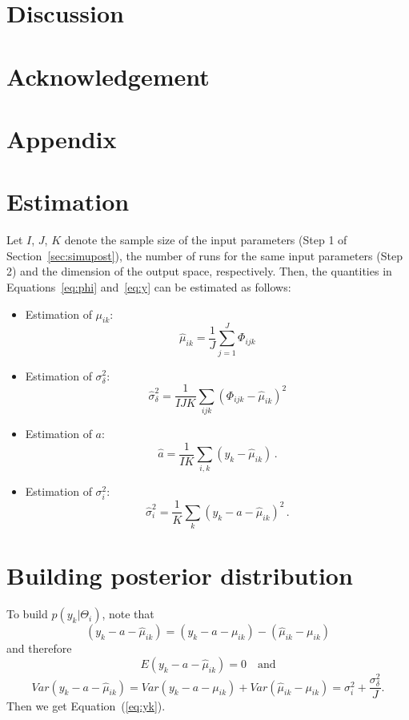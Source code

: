 \documentclass[11pt, fleqn]{article}
\begin{document}
\section{Discussion}
\label{sec:Disc}

\section*{Acknowledgement}

\section*{Appendix}
\begin{appendix}
\section{Estimation}
\label{app:est}
Let $I$, $J$, $K$ denote the sample size of the input parameters (Step 1 of
Section~\ref{sec:simupost}), the number of runs for the same input parameters
(Step 2) and the dimension of the output space, respectively. Then, the
quantities in Equations~\ref{eq:phi} and~\ref{eq:y} can be estimated as
follows: 
\begin{itemize}
\item Estimation of  $\mu_{ik}$:
\begin{equation}
\hat{\mu}_{ik}= \frac{1}{J}\sum_{j=1}^{J}\Phi_{ijk}
\end{equation}
\item Estimation of  $\sigma_{\delta}^2$:
      \begin{equation}
        \label{eq:sigma-delta-est}
        \hat{\sigma}_{\delta}^2 = \frac{1}{IJK}\sum_{ijk}(\Phi_{ijk} -
        \hat{\mu}_{ik})^2
      \end{equation}
\item Estimation of $a$:
      \begin{equation}
        \label{eq:a-est}
        \hat{a} = \frac{1}{IK}\sum_{i,k}(y_k - \hat{\mu}_{ik})\,.
      \end{equation}
\item Estimation  of $\sigma_{i}^2$:
      \begin{equation}
        \label{eq:sigma-i-est}
        \hat{\sigma}_{i}^2 = \frac{1}{K}\sum_{k}(y_{k} - \hat{a} - \hat{\mu}_{ik
})^2 \,.
      \end{equation}
   \end{itemize}

\section{Building posterior distribution}
\label{app:postdistr}
To build $p(y_k|\Theta_i)$, note that
\[
(y_k - a - \hat{\mu}_{ik}) = (y_k - a - \mu_{ik}) - (\hat{\mu}_{ik} -  \mu_{ik})\]
and therefore
\[
E(y_k- a - \hat{\mu}_{ik}) = 0 \quad \text{and}
\]
\[
Var(y_k- a - \hat{\mu}_{ik}) = Var(y_k - a - \mu_{ik}) + Var(\hat{\mu}_{ik} -
\mu_{ik}) = \sigma_i^2 + \frac{\sigma_{\delta}^2}{J}.
\]
Then we get Equation~(\ref{eq:yk}).



\end{appendix}



\end{document}
